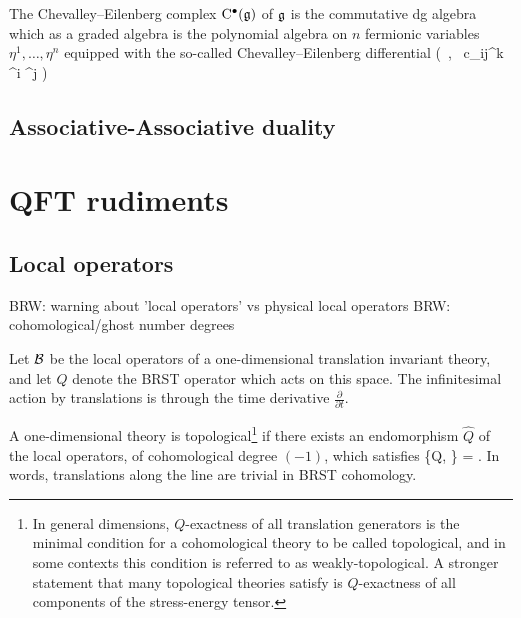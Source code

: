 \documentclass[11pt]{amsart}
\def\brian#1{{\textcolor{blue!65!red}{BRW: {#1}}}}
\begin{document}
The Chevalley--Eilenberg complex ${\rm C}^\bullet(\mathfrak g)$ of $\mathfrak g$ is the commutative dg algebra which as a graded algebra is the polynomial algebra on $n$ fermionic variables $\eta^1, \ldots, \eta^n$ equipped with the so-called Chevalley--Eilenberg differential
\beqn
\left(\CC[\eta^i] \, , \, c_{ij}^k \eta^i \eta^j   \right) 
\eeqn

\subsection{Associative-Associative duality} 




\section{QFT rudiments}


\subsection{Local operators}

\brian{warning about 'local operators' vs physical local operators}
\brian{cohomological/ghost number degrees}

Let $\mathcal B$ be the local operators of a one-dimensional translation invariant theory, and let $Q$ denote the BRST operator which acts on this space. 
The infinitesimal action by translations is through the time derivative $\frac{\partial}{\partial t}$. 

A one-dimensional theory is topological\footnote{In general dimensions, $Q$-exactness of all translation generators is the minimal condition for a cohomological theory to be called topological, and in some contexts this condition is referred to as weakly-topological. A stronger statement that many topological theories satisfy is $Q$-exactness of all components of the stress-energy tensor.} if there exists an endomorphism $\hat{Q}$ of the local operators, of cohomological degree $(-1)$, which satisfies
\beqn\label{eqn:triv}
\{Q, \} =  .
\eeqn
In words, translations along the line are trivial in BRST cohomology. 
\end{document}
